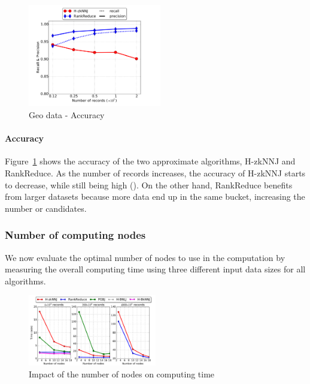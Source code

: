      
       \begin{figure}[!h]
         \centering
         \includegraphics[width=0.52\textwidth]{img-perf/geo/data/accuracy.pdf} 
         \caption{Geo data - Accuracy\label{geo_data_accuracy}}
        \end{figure}
     
\paragraph*{Accuracy}     
Figure~\ref{geo_data_accuracy} shows the accuracy of the two approximate algorithms, H-zkNNJ and RankReduce.
As the number of records increases, the accuracy of H-zkNNJ starts to decrease, while still being high (). 
On the other hand, RankReduce benefits from larger datasets because more data end up in the same bucket, increasing the number or candidates. 

\subsubsection{Number of computing nodes}
We now evaluate the optimal number of nodes to use in the computation by measuring the overall computing time using three 
different input data sizes for all algorithms.
\begin{figure}[!h]
 \centering
 \includegraphics[width=0.5\textwidth]{img-perf/geo/data/nodes.pdf}
 \caption{Impact of the number of nodes on computing time  \label{fig:geo_data_nodes}}
\end{figure}

